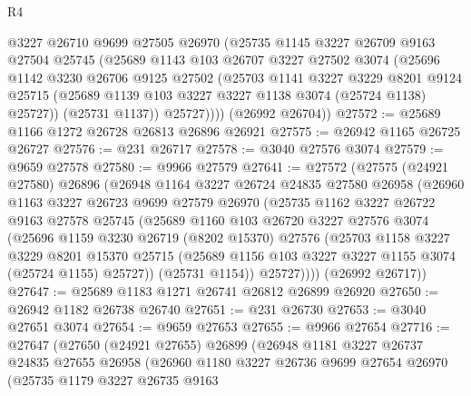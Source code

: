 \begin{lexlean}{R4}
\begin{coremodule}
          @3227
          @26710
          @9699
          @27505
          @26970
          (@25735
            @1145
            @3227
            @26709
            @9163
            @27504
            @25745
            (@25689
              @1143
              @103
              @26707
              @3227
              @27502
              @3074
              (@25696
                @1142
                @3230
                @26706
                @9125
                @27502
                (@25703
                  @1141
                  @3227
                  @3229
                  @8201
                  @9124
                  @25715
                  (@25689 @1139 @103 @3227 @3227 @1138 @3074 (@25724 @1138) @25727))
                (@25731 @1137))
              @25727))))
      (@26992 @26704))
@27572 := @25689 @1166 @1272 @26728 @26813 @26896 @26921
@27575 := @26942 @1165 @26725 @26727
@27576 := @231 @26717
@27578 := @3040 @27576 @3074
@27579 := @9659 @27578
@27580 := @9966 @27579
@27641 := @27572
    (@27575
      (@24921 @27580)
      @26896
      (@26948
        @1164
        @3227
        @26724
        @24835
        @27580
        @26958
        (@26960
          @1163
          @3227
          @26723
          @9699
          @27579
          @26970
          (@25735
            @1162
            @3227
            @26722
            @9163
            @27578
            @25745
            (@25689
              @1160
              @103
              @26720
              @3227
              @27576
              @3074
              (@25696
                @1159
                @3230
                @26719
                (@8202 @15370)
                @27576
                (@25703
                  @1158
                  @3227
                  @3229
                  @8201
                  @15370
                  @25715
                  (@25689 @1156 @103 @3227 @3227 @1155 @3074 (@25724 @1155) @25727))
                (@25731 @1154))
              @25727))))
      (@26992 @26717))
@27647 := @25689 @1183 @1271 @26741 @26812 @26899 @26920
@27650 := @26942 @1182 @26738 @26740
@27651 := @231 @26730
@27653 := @3040 @27651 @3074
@27654 := @9659 @27653
@27655 := @9966 @27654
@27716 := @27647
    (@27650
      (@24921 @27655)
      @26899
      (@26948
        @1181
        @3227
        @26737
        @24835
        @27655
        @26958
        (@26960
          @1180
          @3227
          @26736
          @9699
          @27654
          @26970
          (@25735
            @1179
            @3227
            @26735
            @9163

\end{coremodule}
\end{lexlean}
